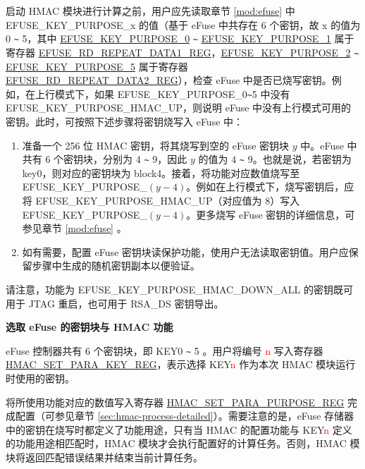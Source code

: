 \documentclass[main\_\_CN.tex]{subfiles}
\begin{document}
启动 HMAC 模块进行计算之前，用户应先读取章节 \ref{mod:efuse} \textit{} 中 EFUSE\_KEY\_PURPOSE\_x 的值（基于 eFuse 中共存在 6 个密钥，故 x 的值为 0 \verb+~+ 5，其中 \hyperref[fielddesc:EFUSEKEYPURPOSE0]{EFUSE\_KEY\_PURPOSE\_0} \verb+~+ \hyperref[fielddesc:EFUSEKEYPURPOSE1]{EFUSE\_KEY\_PURPOSE\_1} 属于寄存器 \hyperref[regdesc:EFUSERDREPEATDATA1REG]{EFUSE\_RD\_REPEAT\_DATA1\_REG}，\hyperref[fielddesc:EFUSEKEYPURPOSE2]{EFUSE\_KEY\_PURPOSE\_2} \verb+~+ \hyperref[fielddesc:EFUSEKEYPURPOSE5]{EFUSE\_KEY\_PURPOSE\_5} 属于寄存器 \hyperref[regdesc:EFUSERDREPEATDATA2REG]{EFUSE\_RD\_REPEAT\_DATA2\_REG}），检查 eFuse 中是否已烧写密钥。例如，在上行模式下，如果 EFUSE\_KEY\_PURPOSE\_0\verb+~+5 中没有 EFUSE\_KEY\_PURPOSE\_HMAC\_UP，则说明 eFuse 中没有上行模式可用的密钥。此时，可按照下述步骤将密钥烧写入 eFuse 中：

\begin{enumerate}
    \item 准备一个 256 位 HMAC 密钥，将其烧写到空的 eFuse 密钥块 $y$ 中。eFuse 中共有 6 个密钥块，分别为 4 \verb+~+ 9，因此 $y$ 的值为 4 \verb+~+ 9。也就是说，若密钥为 key0，则对应的密钥块为 block4。接着，将功能对应数值烧写至 EFUSE\_KEY\_PURPOSE\_$(y-4)$。例如在上行模式下，烧写密钥后，应将 EFUSE\_KEY\_PURPOSE\_HMAC\_UP（对应值为 8）写入 EFUSE\_KEY\_PURPOSE\_$(y-4)$。更多烧写 eFuse 密钥的详细信息，可参见章节 \ref{mod:efuse} \textit{}。
    \item 如有需要，配置 eFuse 密钥块读保护功能，使用户无法读取密钥值。用户应保留步骤中生成的随机密钥副本以便验证。
\end{enumerate}

请注意，功能为 EFUSE\_KEY\_PURPOSE\_HMAC\_DOWN\_ALL 的密钥既可用于 JTAG 重启，也可用于 RSA\_DS 密钥导出。



\textbf{选取 eFuse 的密钥块与 HMAC 功能}
\label{sec:hmac-config-purposes}

eFuse 控制器共有 6 个密钥块，即 KEY0 \verb+~+ 5 。用户将编号 \textcolor{red}{n} 写入寄存器 \hyperref[regdesc:HMACSETPARAKEYREG]{HMAC\_SET\_PARA\_KEY\_REG}，表示选择 KEY\textcolor{red}{n} 作为本次 HMAC 模块运行时使用的密钥。

将所使用功能对应的数值写入寄存器 \hyperref[regdesc:HMACSETPARAPURPOSEREG]{HMAC\_SET\_PARA\_PURPOSE\_REG} 完成配置（可参见章节 \ref{sec:hmac-process-detailed}）。需要注意的是，eFuse 存储器中的密钥在烧写时都定义了功能用途，只有当 HMAC 的配置功能与 KEY\textcolor{red}{n} 定义的功能用途相匹配时，HMAC 模块才会执行配置好的计算任务。否则，HMAC 模块将返回匹配错误结果并结束当前计算任务。
\end{document}
